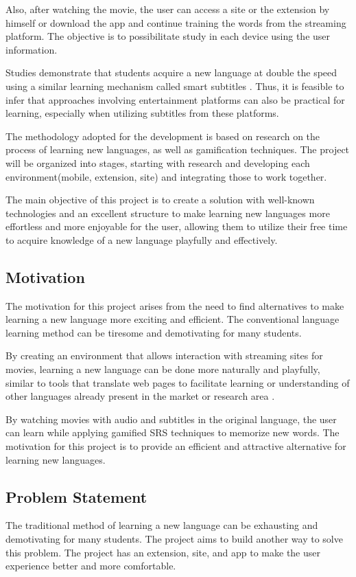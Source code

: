 \documentclass[12pt]{article}
\begin{document}
Also, after watching the movie, the user can access a site or the extension by himself or download the app and continue training the words from the streaming platform. The objective is to possibilitate study in each device using the user information. 

Studies demonstrate that students acquire a new language at double the speed using a similar learning mechanism called smart subtitles \cite{Kovacs13}. Thus, it is feasible to infer that approaches involving entertainment platforms can also be practical for learning, especially when utilizing subtitles from these platforms.

The methodology adopted for the development is based on research on the process of learning new languages, as well as gamification techniques. The project will be organized into stages, starting with research and developing each environment(mobile, extension, site) and integrating those to work together.

The main objective of this project is to create a solution with well-known technologies and an excellent structure to make learning new languages more effortless and more enjoyable for the user, allowing them to utilize their free time to acquire knowledge of a new language playfully and effectively.


\subsection{Motivation}
The motivation for this project arises from the need to find alternatives to make learning a new language more exciting and efficient. The conventional language learning method can be tiresome and demotivating for many students.

By creating an environment that allows interaction with streaming sites for movies, learning a new language can be done more naturally and playfully, similar to tools that translate web pages to facilitate learning or understanding of other languages already present in the market or research area \cite{ElBatanony21}.

By watching movies with audio and subtitles in the original language, the user can learn while applying gamified SRS techniques to memorize new words. The motivation for this project is to provide an efficient and attractive alternative for learning new languages.

\subsection{Problem Statement}
The traditional method of learning a new language can be exhausting and demotivating for many students. The project aims to build another way to solve this problem. The project has an extension, site, and app to make the user experience better and more comfortable.
\end{document}

